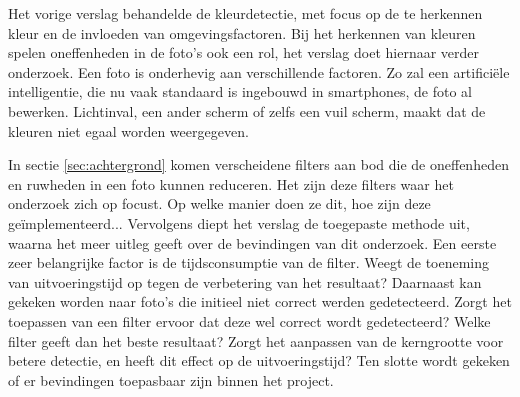 Het vorige verslag behandelde de kleurdetectie, met focus op de te herkennen kleur en de invloeden van omgevingsfactoren. Bij het herkennen van kleuren spelen oneffenheden in de foto's ook een rol, het verslag doet hiernaar verder onderzoek. Een foto is onderhevig aan verschillende factoren. Zo zal een artificiële intelligentie, die nu vaak standaard is ingebouwd in smartphones, de foto al bewerken. Lichtinval, een ander scherm of zelfs een vuil scherm, maakt dat de kleuren niet egaal worden weergegeven.

In sectie \ref{sec:achtergrond} komen verscheidene filters aan bod die de oneffenheden en ruwheden in een foto kunnen reduceren. Het zijn deze filters waar het onderzoek zich op focust. Op welke manier doen ze dit, hoe zijn deze geïmplementeerd... Vervolgens diept het verslag de toegepaste methode uit, waarna het meer uitleg geeft over de bevindingen van dit onderzoek. Een eerste zeer belangrijke factor is de tijdsconsumptie van de filter. Weegt de toeneming van uitvoeringstijd op tegen de verbetering van het resultaat? Daarnaast kan gekeken worden naar foto's die initieel niet correct werden gedetecteerd. Zorgt het toepassen van een filter ervoor dat deze wel correct wordt gedetecteerd? Welke filter geeft dan het beste resultaat? Zorgt het aanpassen van de kerngrootte voor betere detectie, en heeft dit effect op de uitvoeringstijd? Ten slotte wordt gekeken of er bevindingen toepasbaar zijn binnen het project.